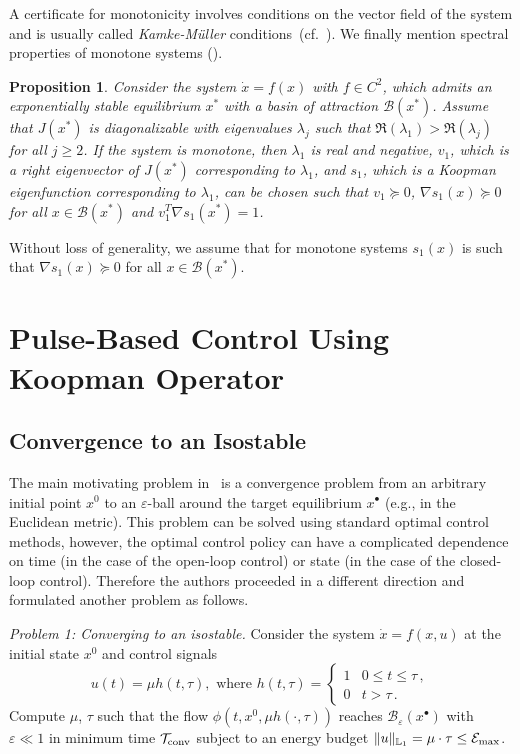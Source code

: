 \documentclass[letterpaper, 10pt, journal]{IEEEtran}  %
\newcommand{\cB}{{\mathcal B}}
\newcommand{\cE}{{\mathcal E}}
\newcommand{\cT}{{\mathcal T}}
\newcommand{\Lone}{{\mathbb L_1}}
\newtheorem{prop}{Proposition}
\begin{document}
A certificate for monotonicity involves conditions on the vector field of the system and is usually called	
\emph{Kamke-M\"uller} conditions~(cf.~\cite{angeli2003monotone}). We finally mention spectral properties of monotone systems (\cite{sootla2016geometry}).
\begin{prop} \label{prop:mon-eig-fun}
	Consider the system $\dot x = f(x)$ with $f\in C^2$, which admits an exponentially stable equilibrium $x^\ast$ with a basin of attraction $\cB(x^\ast)$. Assume that $J(x^\ast)$ is diagonalizable with eigenvalues $\lambda_j$ such that $\Re(\lambda_1) > \Re(\lambda_j)$ for all $j\ge 2$. If the system is monotone, then $\lambda_1$ is real and negative, $v_1$, which is a right eigenvector of $J(x^\ast)$ corresponding to $\lambda_1$, and $s_1$, which is a Koopman eigenfunction corresponding to $\lambda_1$, can be chosen such that $v_1 \succeq 0$, $\nabla s_1(x) \succeq 0$ for all $x\in \cB(x^\ast)$ and $v_1^T \nabla s_1(x^\ast) = 1$. 
\end{prop}

Without loss of generality, we assume that for monotone systems $s_1(x)$ is such that $\nabla s_1(x)\succeq 0$ for all $x\in\cB(x^\ast)$. 

\section{Pulse-Based Control Using Koopman Operator} \label{s:switching}
\subsection{Convergence to an Isostable} \label{ss:sol-koopman}
The main motivating problem in~\cite{sootla2016optimalswitching} is a convergence problem from an arbitrary initial point $x^0$ to an $\varepsilon$-ball around the target equilibrium $x^\bullet$  (e.g., in the Euclidean metric). This problem can be solved using standard optimal control methods, however, the optimal control policy can have a complicated dependence on time (in the case of the open-loop control) or state (in the case of the closed-loop control). Therefore the authors proceeded in a different direction and formulated another problem as follows.

\emph{Problem 1: Converging to an isostable.} Consider the system $\dot x = f(x,u)$ at the initial state $x^0$ and control signals 
\begin{equation}
u(t) = \mu h(t,\tau), \textrm{ where  } 
h(t,\tau) = 
\begin{cases} 1 & 0 \leq t \leq \tau\,,\\
0 & t >\tau\,.
\end{cases} \label{eq:pulse}
\end{equation}
Compute $\mu$, $\tau$ such that the flow $\phi(t,x^0, \mu h(\cdot, \tau))$ reaches $\cB_\varepsilon(x^\bullet)$ with $\varepsilon\ll 1$ in minimum time $\cT_{\rm conv}$ subject to an energy budget $\|u\|_\Lone =\mu\cdot \tau\le \cE_{\rm max}$.
\end{document}
